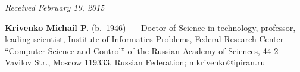 \vspace*{-4pt}

\hfill{\small\textit{Received February 19, 2015}}

\vspace*{-18pt}



\Contrl

\noindent
\textbf{Krivenko Michail P.} (b.\ 1946)~---
 Doctor of Science in technology, professor, leading scientist, Institute of
Informatics Problems, Federal Research Center ``Computer Science and
Control'' of the Russian Academy of Sciences, 44-2 Vavilov Str., Moscow
119333, Russian Federation; mkrivenko@ipiran.ru
\label{end\stat}


\renewcommand{\bibname}{\protect\rm Литература}
